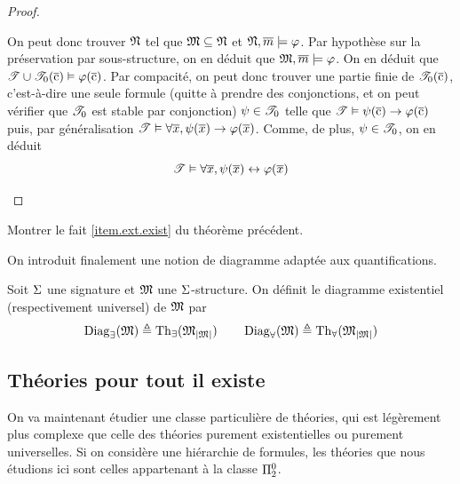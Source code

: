 \begin{proof}
\begin{itemize}
    On peut donc trouver $\mathfrak{N}$ tel que $\mathfrak{M}\subseteq\mathfrak{N}$ et
    $\mathfrak{N},\overline{m}\models\varphi$. Par hypothèse sur la préservation par
    sous-structure, on en déduit que $\mathfrak{M},\overline{m}\models\varphi$. On en déduit
    que $\mathscr T\cup\mathscr T_0(\overline{\mathrm{c}})\vDash\varphi(\overline{\mathrm{c}})$. Par compacité,
    on peut donc trouver une partie finie de $\mathscr T_0(\overline{\mathrm{c}})$, c'est-à-dire
    une seule formule (quitte à prendre des conjonctions, et on peut
    vérifier que $\mathscr T_0$ est stable par conjonction) $\psi\in\mathscr T_0$
    telle que $\mathscr T\vDash\psi(\overline{\mathrm{c}})\to\varphi(\overline{\mathrm{c}})$ puis, par
    généralisation $\mathscr T\vDash\forall \overline{x},\psi(\overline{x})\to\varphi(\overline{x})$.
    Comme, de plus, $\psi\in\mathscr T_0$, on en déduit
    \[\mathscr T\vDash\forall \overline{x}, \psi(\overline{x})\mathrel{\leftrightarrow}\varphi(\overline{x})\qedhere\]
  \end{itemize}
\end{proof}

\begin{exercise}
  Montrer le fait \ref{item.ext.exist} du théorème précédent.
\end{exercise}

\noindent
On introduit finalement une notion de diagramme adaptée aux quantifications.

\begin{definition}
  Soit $\Sigma$ une signature et $\mathfrak{M}$ une $\Sigma$-structure. On définit le
  diagramme existentiel (respectivement universel) de $\mathfrak{M}$ par
  \[\operatorname{Diag}_{\exists}(\mathfrak{M})\triangleq \operatorname{Th}_{\exists}(\mathfrak{M}_{\left\vert \mathfrak{M}\right\vert})\qquad
  \operatorname{Diag}_{\forall}(\mathfrak{M})\triangleq \operatorname{Th}_{\forall}(\mathfrak{M}_{\left\vert \mathfrak{M}\right\vert})\]
  \index[notation]{$\Diag_{\exists}(\varMM)$}
  \index[notation]{$\Diag_{\forall}(\varMM)$}
\end{definition}

\subsection{Théories \og pour tout il existe\fg}

On va maintenant étudier une classe particulière de théories, qui est légèrement
plus complexe que celle des théories purement existentielles ou purement
universelles. Si on considère une hiérarchie de formules, les théories que nous
étudions ici sont celles appartenant à la classe $\Pi^0_{2}$.

